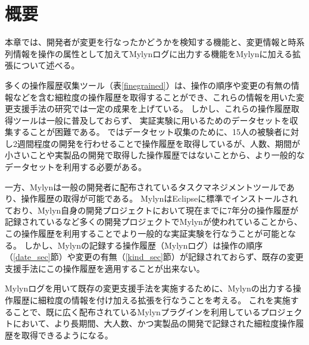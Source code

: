 \documentclass[a4paper]{jsbook}
\begin{document}
\section{概要}
本章では、開発者が変更を行なったかどうかを検知する機能と、変更情報と時系列情報を操作の属性として加えてMylynログに出力する機能をMylynに加える拡張について述べる。

多くの操作履歴収集ツール（表\ref{finegrained}）は、操作の順序や変更の有無の情報などを含む細粒度の操作履歴を取得することができ、これらの情報を用いた変更支援手法の研究では一定の成果を上げている。
しかし、これらの操作履歴取得ツールは一般に普及しておらず、
実証実験に用いるためのデータセットを収集することが困難である。
\cite{6233415,KatoJapanese:2011,ss2012-76,ss2013-84,Yamamori:2016}ではデータセット収集のために、15人の被験者に対し2週間程度の開発を行わせることで操作履歴を取得しているが、人数、期間が小さいことや実製品の開発で取得した操作履歴ではないことから、より一般的なデータセットを利用する必要がある。

一方、Mylyn\cite{Kersten:2005}は一般の開発者に配布されているタスクマネジメントツールであり、操作履歴の取得が可能である。
MylynはEclipseに標準でインストールされており、Mylyn自身の開発プロジェクトにおいて現在までに7年分の操作履歴が記録されているなど多くの開発プロジェクトでMylynが使われていることから、この操作履歴を利用することでより一般的な実証実験を行なうことが可能となる。
しかし、Mylynの記録する操作履歴（Mylynログ）は操作の順序（\ref{date_sec}節）や変更の有無（\ref{kind_sec}節）が記録されておらず、既存の変更支援手法にこの操作履歴を適用することが出来ない。

Mylynログを用いて既存の変更支援手法を実施するために、Mylynの出力する操作履歴に細粒度の情報を付け加える拡張を行なうことを考える。
これを実施することで、既に広く配布されているMylynプラグインを利用しているプロジェクトにおいて、より長期間、大人数、かつ実製品の開発で記録された細粒度操作履歴を取得できるようになる。
\end{document}
